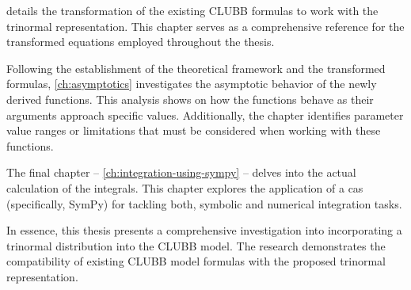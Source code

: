 details the transformation of the existing \gls{CLUBB} formulas to work with the trinormal representation.
This chapter serves as a comprehensive reference for the transformed equations employed throughout the thesis.

Following the establishment of the theoretical framework and the transformed formulas,
\cref{ch:asymptotics} investigates the asymptotic behavior of the newly derived functions.
This analysis shows on how the functions behave as their arguments approach specific values.
Additionally, the chapter identifies parameter value ranges or limitations
that must be considered when working with these functions.

The final chapter -- \cref{ch:integration-using-sympy} --
delves into the actual calculation of the integrals.
This chapter explores the application of a \gls{cas} (specifically, SymPy)
for tackling both, symbolic and numerical integration tasks.

In essence,
this thesis presents a comprehensive investigation
into incorporating a trinormal distribution into the \gls{CLUBB} model.
The research demonstrates the compatibility of existing \gls{CLUBB} model formulas
with the proposed trinormal representation.
